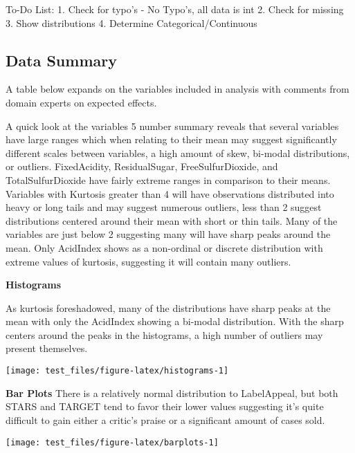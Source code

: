 \documentclass[
]{article}
\begin{document}
To-Do List: 1. Check for typo's - No Typo's, all data is int 2. Check
for missing 3. Show distributions 4. Determine Categorical/Continuous

\subsection{Data Summary}\label{data-summary}

A table below expands on the variables included in analysis with
comments from domain experts on expected effects.

\newline

A quick look at the variables 5 number summary reveals that several
variables have large ranges which when relating to their mean may
suggest significantly different scales between variables, a high amount
of skew, bi-modal distributions, or outliers. FixedAcidity,
ResidualSugar, FreeSulfurDioxide, and TotalSulfurDioxide have fairly
extreme ranges in comparison to their means. Variables with Kurtosis
greater than 4 will have observations distributed into heavy or long
tails and may suggest numerous outliers, less than 2 suggest
distributions centered around their mean with short or thin tails. Many
of the variables are just below 2 suggesting many will have sharp peaks
around the mean. Only AcidIndex shows as a non-ordinal or discrete
distribution with extreme values of kurtosis, suggesting it will contain
many outliers.

\newpage

\textbf{Histograms}

As kurtosis foreshadowed, many of the distributions have sharp peaks at
the mean with only the AcidIndex showing a bi-modal distribution. With
the sharp centers around the peaks in the histograms, a high number of
outliers may present themselves.

\begin{center}\texttt{[image: test\_files/figure-latex/histograms-1]} \end{center}

\newpage

\textbf{Bar Plots} There is a relatively normal distribution to
LabelAppeal, but both STARS and TARGET tend to favor their lower values
suggesting it's quite difficult to gain either a critic's praise or a
significant amount of cases sold.

\begin{center}\texttt{[image: test\_files/figure-latex/barplots-1]} \end{center}
\end{document}

